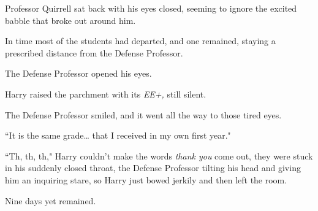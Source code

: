 Professor Quirrell sat back with his eyes closed, seeming to ignore the excited babble that broke out around him.

In time most of the students had departed, and one remained, staying a prescribed distance from the Defense Professor.

The Defense Professor opened his eyes.

Harry raised the parchment with its \emph{EE+,} still silent.

The Defense Professor smiled, and it went all the way to those tired eyes.

``It is the same grade{\ldots} that I received in my own first year."

``Th, th, th," Harry couldn't make the words \emph{thank you} come out, they were stuck in his suddenly closed throat, the Defense Professor tilting his head and giving him an inquiring stare, so Harry just bowed jerkily and then left the room.

Nine days yet remained.


